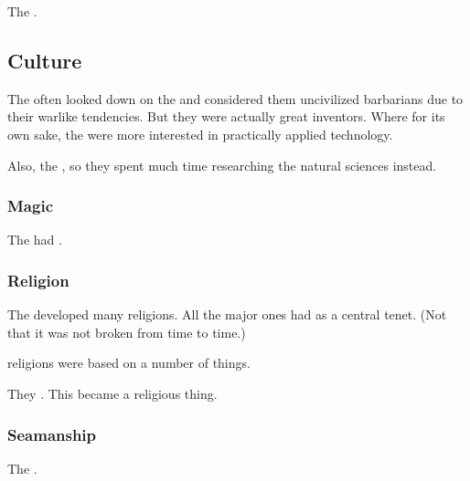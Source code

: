 The \aryothim {}. 









\subsection{Culture}





The \quiljaaran{} often looked down on the \aryoth{} and considered them uncivilized barbarians due to their warlike tendencies. 
But they were actually great inventors. 
Where  for its own sake, the \aryothim{} were more interested in practically applied technology. 

Also, the \aryothim {}, so they spent much time researching the natural sciences instead. 





\subsubsection{Magic}
The {\aryothim} had . 





\subsubsection{Religion}
The \aryothim developed many religions. 
All the major ones had  as a central tenet. 
(Not that it was not broken from time to time.)

\Aryoth religions were based on a number of things. 

They . 
This became a religious thing. 






\subsubsection{Seamanship}
The \aryothim{} . 





